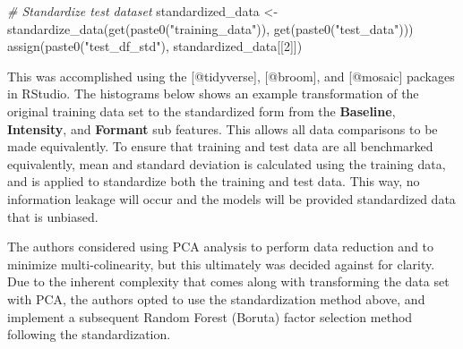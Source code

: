 \documentclass[
]{article}
\newenvironment{Shaded}{\begin{snugshade}}{\end{snugshade}}
\newcommand{\CommentTok}[1]{\textcolor[rgb]{0.56,0.35,0.01}{\textit{#1}}}
\newcommand{\DecValTok}[1]{\textcolor[rgb]{0.00,0.00,0.81}{#1}}
\newcommand{\FunctionTok}[1]{\textcolor[rgb]{0.00,0.00,0.00}{#1}}
\newcommand{\NormalTok}[1]{#1}
\newcommand{\OtherTok}[1]{\textcolor[rgb]{0.56,0.35,0.01}{#1}}
\newcommand{\StringTok}[1]{\textcolor[rgb]{0.31,0.60,0.02}{#1}}
\begin{document}
\begin{Shaded}
\begin{Highlighting}[]
\CommentTok{\# Standardize test dataset}
\NormalTok{  standardized\_data }\OtherTok{\textless{}{-}} \FunctionTok{standardize\_data}\NormalTok{(}\FunctionTok{get}\NormalTok{(}\FunctionTok{paste0}\NormalTok{(}\StringTok{"training\_data"}\NormalTok{)), }\FunctionTok{get}\NormalTok{(}\FunctionTok{paste0}\NormalTok{(}\StringTok{"test\_data"}\NormalTok{)))}
  \FunctionTok{assign}\NormalTok{(}\FunctionTok{paste0}\NormalTok{(}\StringTok{"test\_df\_std"}\NormalTok{), standardized\_data[[}\DecValTok{2}\NormalTok{]])}
\end{Highlighting}
\end{Shaded}

\newpage

This was accomplished using the {[}@tidyverse{]}, {[}@broom{]}, and {[}@mosaic{]} packages in RStudio. The histograms below shows an example transformation of the original training data set to the standardized form from the \textbf{Baseline}, \textbf{Intensity}, and \textbf{Formant} sub features. This allows all data comparisons to be made equivalently. To ensure that training and test data are all benchmarked equivalently, mean and standard deviation is calculated using the training data, and is applied to standardize both the training and test data. This way, no information leakage will occur and the models will be provided standardized data that is unbiased.

The authors considered using PCA analysis to perform data reduction and to minimize multi-colinearity, but this ultimately was decided against for clarity. Due to the inherent complexity that comes along with transforming the data set with PCA, the authors opted to use the standardization method above, and implement a subsequent Random Forest (Boruta) factor selection method following the standardization.
\end{document}

